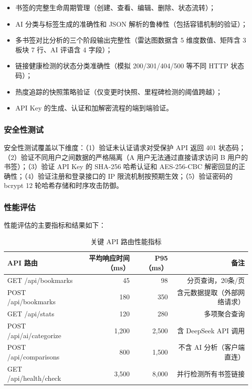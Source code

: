 \documentclass[12pt,a4paper]{ctexart}
\begin{document}
\begin{itemize}
  \item 书签的完整生命周期管理（创建、查看、编辑、删除、状态流转）；
  \item AI 分类与标签生成的准确性和 JSON 解析的鲁棒性（包括容错机制的验证）；
  \item 多书签对比分析的三个阶段输出完整性（雷达图数据含 5 维度数值、矩阵含 3 板块 7 行、AI 评语含 4 字段）；
  \item 链接健康检测的状态分类准确性（模拟 200/301/404/500 等不同 HTTP 状态码）；
  \item 热度追踪的快照策略验证（仅变更时快照、里程碑检测的阈值跨越）；
  \item API Key 的生成、认证和加解密流程的端到端验证。
\end{itemize}

\subsubsection{安全性测试}

安全性测试覆盖以下维度：（1）验证未认证请求对受保护 API 返回 401 状态码；（2）验证不同用户之间数据的严格隔离（A 用户无法通过直接请求访问 B 用户的书签）；（3）验证 API Key 的 SHA-256 哈希认证和 AES-256-CBC 解密回显的正确性；（4）验证注册和登录接口的 IP 限流机制按预期生效；（5）验证密码的 bcrypt 12 轮哈希存储和时序攻击防御。

\subsubsection{性能评估}

性能评估的主要指标和结果如下：

\begin{table}[H]
\centering
\caption{关键 API 路由性能指标}
\label{tab:performance}
\begin{tabular}{@{}lrrr@{}}
\toprule
\textbf{API 路由}               & \textbf{平均响应时间（ms）} & \textbf{P95（ms）} & \textbf{备注}      \\
\midrule
GET /api/bookmarks            & 45                       & 98                & 分页查询，20条/页       \\
POST /api/bookmarks           & 180                      & 350               & 含元数据提取（外部网络请求）  \\
GET /api/stats                & 120                      & 280               & 多项聚合查询           \\
POST /api/ai/categorize       & 1,200                    & 2,500             & 含 DeepSeek API 调用 \\
POST /api/comparisons         & 800                      & 1,500             & 不含 AI 分析（客户端直连） \\
GET /api/health/check         & 3,500                    & 8,000             & 并行检测所有书签链接       \\
\bottomrule
\end{tabular}
\end{table}
\end{document}

